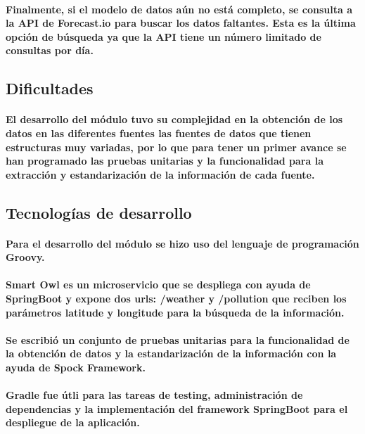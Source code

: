     \paragraph{Finalmente, si el modelo de datos aún no está completo, se consulta a la API de Forecast.io para buscar los datos faltantes. Esta es la última opción de búsqueda ya que la API tiene un número limitado de consultas por día.}


  \subsection{Dificultades}
    \paragraph{El desarrollo del módulo tuvo su complejidad en la obtención de los datos en las diferentes fuentes 
las fuentes de datos que tienen estructuras muy variadas, por lo que para tener un primer avance se han programado las pruebas unitarias y la funcionalidad para la extracción y estandarización de la información de cada fuente.}
  

  \subsection{Tecnologías de desarrollo}
  \paragraph{Para el desarrollo del módulo se hizo uso del lenguaje de programación Groovy.} 

  \paragraph{Smart Owl es un microservicio que se despliega con ayuda de SpringBoot y expone dos urls: /weather y /pollution que reciben los parámetros \textbf{latitude} y \textbf{longitude} para la búsqueda de la información.}

  \paragraph{Se escribió un conjunto de pruebas unitarias para la funcionalidad de la obtención de datos y la estandarización de la información con la ayuda de Spock Framework.}
  \paragraph{Gradle fue útli para las tareas de testing, administración de dependencias y la implementación del framework SpringBoot para el despliegue de la aplicación.}

